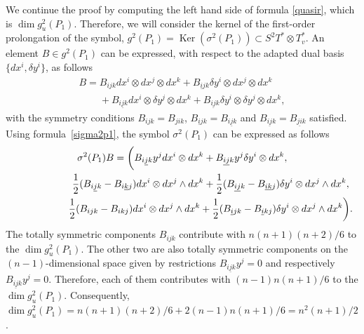 We continue the proof by computing the left hand side of formula
\eqref{quasir}, which is $\dim g^2_u(P_1)$.
Therefore, we will consider the kernel of the f\/irst-order prolongation of the symbol,
$g^2(P_1)=\operatorname{Ker}\left(\sigma^2(P_1)\right)\subset
S^2T^*\otimes T^*_v$. An element $B\in g^2(P_1)$ can be expressed,
with respect to the adapted dual basis $\{dx^i, \delta y^i\}$, as
follows
\begin{gather*}
B=B_{ijk}dx^i\otimes dx^j\otimes dx^k + B_{\underline{i}jk}\delta
y^i \otimes dx^j \otimes dx^k \\
\phantom{B=}{} + B_{i\underline{j}k}dx^i \otimes
\delta y^j \otimes dx^k + B_{\underline{ij}k}\delta y^i \otimes
\delta y^j \otimes dx^k,
\end{gather*}
with the symmetry conditions $B_{ijk}=B_{jik}$,
$B_{\underline{i}jk}=B_{i\underline{j}k}$ and
$B_{\underline{ij}k}=B_{\underline{ji}k}$ satisf\/ied. Using formula~\eqref{sigma2p1}, the symbol $\sigma^2(P_1)$ can be expressed as
follows
\begin{gather*}
\sigma^2(P_1)B  = \bigg(B_{i\underline{j}k}y^j dx^i \otimes dx^k +
B_{\underline{ij}k}y^j \delta y^i \otimes dx^k,  \\
\hphantom{\sigma^2(P_1)B  = \bigg(}{}  \frac{1}{2}(B_{i\underline{j}k} -
B_{i\underline{k}j})dx^i\otimes dx^j \wedge dx^k +
\frac{1}{2}(B_{\underline{ij}k} - B_{\underline{ik}j})\delta
y^i\otimes dx^j \wedge dx^k, \\
\hphantom{\sigma^2(P_1)B  = \bigg(}{}  \frac{1}{2}(B_{ijk} - B_{ikj})dx^i\otimes dx^j \wedge
dx^k + \frac{1}{2}(B_{\underline{i}jk} -
B_{\underline{i}kj})\delta y^i\otimes dx^j \wedge dx^k\bigg).
\end{gather*}
The totally symmetric components $B_{ijk}$ contribute with
$n(n+1)(n+2)/6$ to the $\dim g^2_u(P_1)$. The other two are also
totally symmetric components on the $(n-1)$-dimensional space
given by restrictions $B_{i\underline{j}k}y^j=0$ and respectively
$B_{\underline{ij}k}y^j=0$. Therefore, each of them contributes
with $(n-1)n(n+1)/6$ to the $\dim g^2_u(P_1)$. Consequently, $\dim
g^2_u(P_1)=n(n+1)(n+2)/6+2(n-1)n(n+1)/6=n^2(n+1)/2$.
